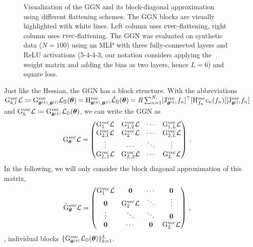 \begin{figure}
\begin{minipage}[t]{0.495\linewidth}
  \end{minipage}
  \caption{Visualization of the GGN and its block-diagonal approximation using different flattening schemes.
    The GGN blocks are visually highlighted with white lines.
    Left column uses $\operatorname{cvec}$-flattening, right column uses $\operatorname{rvec}$-flattening.
    The GGN was evaluated on synthetic data ($N=100$) using an MLP with three fully-connected layers and ReLU activations (5-4-4-3, our notation considers applying the weight matrix and adding the bias as two layers, hence $L=6$) and square loss.
  }
\end{figure}

\switchcolumn[0]
Just like the Hessian, the GGN has a block structure. With the abbreviations
$\mathrm{G}_{k,l}^{\operatorname{vec}}{\mathcal{L}} \coloneq \mathrm{G}^{\operatorname{vec}}_{{\bm{\theta}}^{(k)}, {\bm{\theta}}^{(l)}} {\mathcal{L}}_{{\mathbb{D}}}({\bm{\theta}}) = \mathrm{H}^{\operatorname{vec}}_{{\bm{\theta}}^{(k)}, {\bm{\theta}}^{(l)}} \tilde{{\mathcal{L}}}_{{\mathbb{D}}}({\bm{\theta}}) = R \sum_{n=1}^N [\mathrm{J}_{{\bm{\theta}}^{(k)}}^{\operatorname{vec}} f_n]^{\top} [\mathrm{H}^{\operatorname{vec}}_{f_n} c_n(f_n)] [\mathrm{J}_{{\bm{\theta}}^{(l)}}^{\operatorname{vec}} f_n]$ and $\mathrm{G}_{k}^{\operatorname{vec}}{\mathcal{L}} \coloneq \mathrm{G}^{\operatorname{vec}}_{{\bm{\theta}}^{(k)}} {\mathcal{L}}_{{\mathbb{D}}}({\bm{\theta}})$, we can write the GGN as
\begin{align*}
  \mathrm{G}_{{\bm{\theta}}}^{\operatorname{vec}} {\mathcal{L}}
  =
  \begin{pmatrix}
    \mathrm{G}_1^{\operatorname{vec}} {\mathcal{L}}
    &
      \mathrm{G}_{1, 2}^{\operatorname{vec}} {\mathcal{L}}
    &
      \cdots
    &
      \mathrm{G}_{1, L}^{\operatorname{vec}} {\mathcal{L}}
    \\
    \mathrm{G}_{2, 1}^{\operatorname{vec}} {\mathcal{L}}
    &
      \mathrm{G}_2^{\operatorname{vec}} {\mathcal{L}}
    &
      \cdots
    &
      \mathrm{G}_{2, L}^{\operatorname{vec}} {\mathcal{L}}
    \\
    \vdots & \cdots & \ddots & \vdots
    \\
    \mathrm{G}_{L, 1}^{\operatorname{vec}} {\mathcal{L}}
    &
      \mathrm{G}_{L, 2}^{\operatorname{vec}} {\mathcal{L}}
    &
      \cdots
    &
      \mathrm{G}_L^{\operatorname{vec}} {\mathcal{L}}
  \end{pmatrix}\,.
\end{align*}
In the following, we will only consider the block diagonal approximation of this matrix,
\begin{align*}
  \tilde{\mathrm{G}}_{{\bm{\theta}}}^{\operatorname{vec}} {\mathcal{L}}
  =
  \begin{pmatrix}
    \mathrm{G}_1^{\operatorname{vec}} {\mathcal{L}} & {\bm{0}} & \cdots & {\bm{0}}
    \\
    {\bm{0}} & \mathrm{G}_2^{\operatorname{vec}} {\mathcal{L}} & \ddots & \vdots
    \\
    \vdots & \ddots & \ddots & {\bm{0}}
    \\
    {\bm{0}} & \cdots & {\bm{0}} & \mathrm{G}_L^{\operatorname{vec}} {\mathcal{L}}
  \end{pmatrix}\,,
\end{align*}
\ie, individual blocks $\{ \mathrm{G}_{{\bm{\theta}}^{(k)}}^{\operatorname{vec}} {\mathcal{L}}_{{\mathbb{D}}}({\bm{\theta}})\}_{k=1}^L$.

